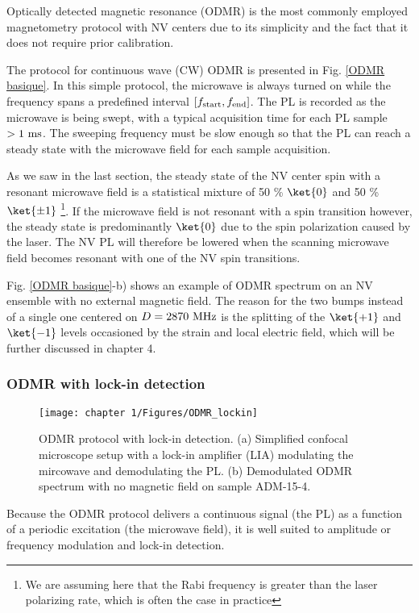 \documentclass[a4paper, 11pt]{book}
\begin{document}
Optically detected magnetic resonance (ODMR) is the most commonly employed magnetometry protocol with NV centers due to its simplicity and the fact that it does not require prior calibration.

The protocol for continuous wave (CW) ODMR is presented in Fig. \ref{ODMR basique}. In this simple protocol, the microwave is always turned on while the frequency spans a predefined interval $[f_{\rm start}, f_{\rm end}]$. The PL is recorded as the microwave is being swept, with a typical acquisition time for each PL sample $> 1\ \rm ms$. The sweeping frequency must be slow enough so that the PL can reach a steady state with the microwave field for each sample acquisition. 

As we saw in the last section, the steady state of the NV center spin with a resonant microwave field is a statistical mixture of 50 \% $\ket{0}$ and 50 \% $\ket{\pm 1}$ \footnote{We are assuming here that the Rabi frequency is greater than the laser polarizing rate, which is often the case in practice}. If the microwave field is not resonant with a spin transition however, the steady state is predominantly $\ket{0}$ due to the spin polarization caused by the laser. The NV PL will therefore be lowered when the scanning microwave field becomes resonant with one of the NV spin transitions. 

Fig. \ref{ODMR basique}-b) shows an example of ODMR spectrum on an NV ensemble with no external magnetic field. The reason for the two bumps instead of a single one centered on $D=2870\ \rm MHz$ is the splitting of the $\ket{+1}$ and $\ket{-1}$ levels occasioned by the strain and local electric field, which will be further discussed in chapter 4.

\subsubsection{ODMR with lock-in detection}
\begin{figure}[h!]
\centering
\texttt{[image: chapter 1/Figures/ODMR\_lockin]}
\caption{ODMR protocol with lock-in detection. (a) Simplified confocal microscope setup with a lock-in amplifier (LIA) modulating the mircowave and demodulating the PL. (b) Demodulated ODMR spectrum with no magnetic field on sample ADM-15-4.}
\label{ODMR lockin}
\end{figure}


Because the ODMR protocol delivers a continuous signal (the PL) as a function of a periodic excitation (the microwave field), it is well suited to amplitude or frequency modulation and lock-in detection. 
\end{document}
